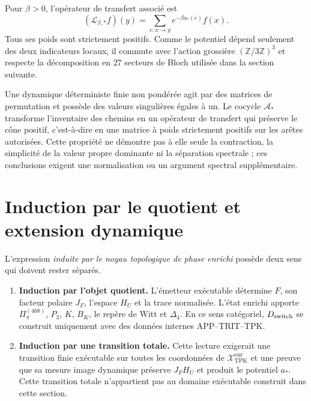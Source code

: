 Pour \(\beta>0\), l’opérateur de transfert associé est
\[
 (\mathcal L_{\beta,*}f)(y)
 =\sum_{e:x\to y}e^{-\beta a_*(e)}f(x).
\]
Tous ses poids sont strictement positifs. Comme le potentiel dépend seulement
des deux indicateurs locaux, il commute avec l’action grossière
\((\mathbb Z/3\mathbb Z)^3\) et respecte la décomposition en \(27\)
secteurs de Bloch utilisée dans la section suivante.

Une dynamique déterministe finie non pondérée agit par des matrices de
permutation et possède des valeurs singulières égales à un. Le cocycle
\(\mathcal A_*\) transforme l’inventaire des chemins en un opérateur de
transfert qui préserve le cône positif, c’est-à-dire en une matrice à
poids strictement positifs sur les arêtes autorisées. Cette propriété ne
démontre pas à elle seule la contraction, la simplicité de la valeur propre dominante ni
la séparation spectrale ; ces conclusions exigent une normalisation ou un
argument spectral supplémentaire.

\ifdefined\HMTInternalTraceability
\section{Induction par le quotient et extension dynamique}

L’expression \emph{induite par le noyau topologique de phase enrichi} possède deux sens qui doivent rester
séparés.

\begin{enumerate}
  \item \textbf{Induction par l’objet quotient.} L’émetteur exécutable
  détermine \(F\), son facteur polaire \(J_F\), l’espace \(H_U\) et la
  trace normalisée. L’état enrichi apporte
  \(\Pi_\pi^{(468)}\), \(P_3\),
  \(K\), \(B_K\), le repère de Witt et \(\Delta_4\). En ce sens
  catégoriel, \(D_{\rm switch}\) se construit uniquement avec des données internes
  APP--TRIT--TPK\@.
  \item \textbf{Induction par une transition totale.} Cette lecture exigerait
  une transition finie exécutable sur toutes les coordonnées de
  \(\mathcal X_{\mathrm{TPK}}^{\mathrm{enr}}\) et une preuve que sa
  mesure image dynamique
  préserve \(J_FH_U\) et produit le potentiel \(a_*\). Cette transition totale
  n’appartient pas au domaine exécutable construit dans cette section.
\end{enumerate}

